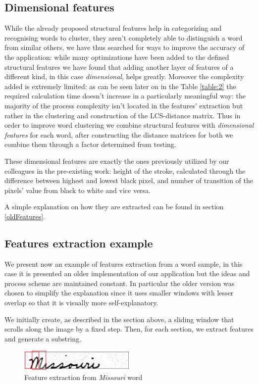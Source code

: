 \subsection{Dimensional features}
While the already proposed structural features help in categorizing and recognising words to cluster, they aren't completely able to distinguish a word from similar others, we have thus searched for ways to improve the accuracy of the application:
while many optimizations have been added to the defined structural features we have found that adding another layer of features of a different kind, in this case \emph{dimensional}, helps greatly.
Moreover the complexity added is extremely limited: as can be seen later on in the Table \ref{table:2} the required calculation time doesn't increase in a particularly meaningful way: the majority of the process complexity isn't located in the features' extraction but rather in the clustering and construction of the LCS-distance matrix.  
Thus in order to improve word clustering we combine structural features with \emph{dimensional features} for each word, after constructing the distance matrices for both we combine them through a factor determined from testing. 

These dimensional features are exactly the ones previously utilized by our colleagues in the pre-existing work: height of the stroke, calculated through the difference between highest and lowest black pixel, and number of transition of the pixels' value from black to white and vice versa.

A simple explanation on how they are extracted can be found in section \ref{oldFeatures}.

\subsection{Features extraction example}
\label{FEE}
We present now an example of features extraction from a word sample, in this case it is presented an older implementation of our application but the ideas and process scheme are maintained constant.
In particular the older version was chosen to simplify the explanation since it uses smaller windows with lesser overlap so that it is visually more self-explanatory.

We initially create, as described in the section above, a sliding window that scrolls along the image by a fixed step. Then, for each section, we extract features and generate a substring.

\begin{figure}[!htpb]
\centering
\includegraphics[width=0.5\textwidth]{images/missouri_crop.jpg}
\caption{Feature extraction from \emph{Missouri} word}
\end{figure} 

